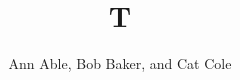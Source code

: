 \documentclass{revtex4-1}
\begin{document}
\title{T}
\author{Ann Able, Bob Baker, and Cat Cole}
\maketitle
\end{document}

